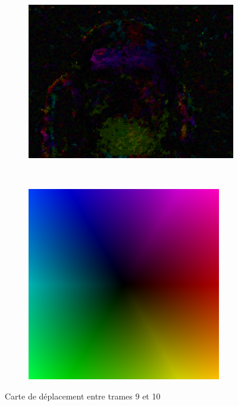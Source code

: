 \documentclass[compress,pdf,11pt,xcolor=dvipsnames]{beamer}
\begin{document}
\begin{frame}{}
\begin{figure}[ht!]
        \centering
        \begin{subfigure}[b]{0.60\textwidth}
                \centering
                \includegraphics[width=\textwidth]{img/f9disp}
        \end{subfigure}%
        ~ %
        \begin{subfigure}[b]{0.40\textwidth}
                \centering
                \includegraphics[scale=0.43]{img/ColorChart}
        \end{subfigure}
        \caption{Carte de déplacement entre trames 9 et 10}

\end{figure}
\end{frame}{}
\end{document}
